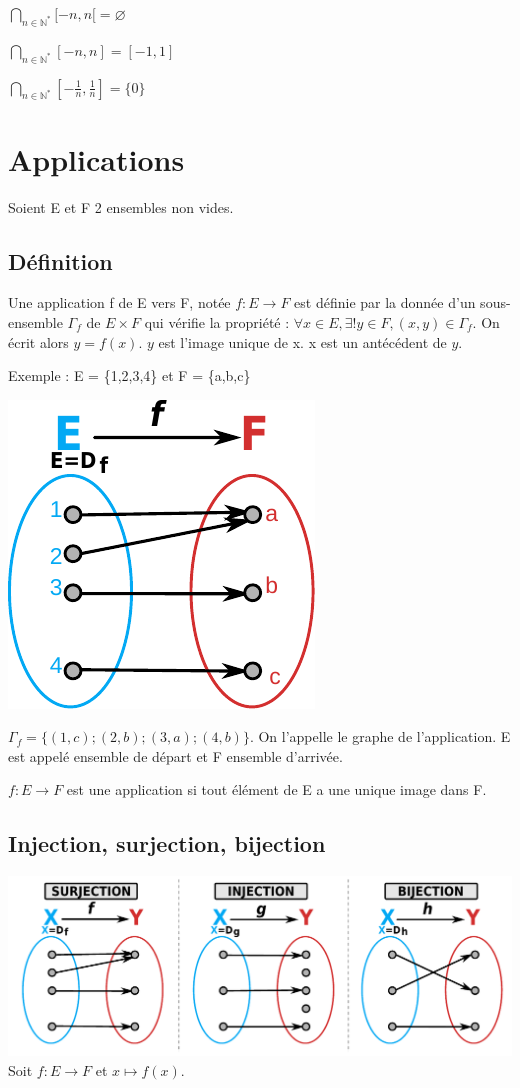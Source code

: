 \documentclass[french]{yLectureNote}
\begin{document}
$\bigcap\limits_{n\in \mathbb{N}^*} [-n, n[ = \varnothing$

$\bigcap\limits_{n\in \mathbb{N}^*} [-n, n] = [-1,1]$

$\bigcap\limits_{n\in \mathbb{N}^*} [-\frac{1}{n}, \frac{1}{n}] = \{0\}$

\section{Applications}
Soient E et F 2 ensembles non vides.
\subsection{Définition}
\begin{theorem}[Definition]
Une application f de E vers F, notée $f:E \rightarrow F$ est définie par la donnée d'un sous-ensemble $\Gamma_f$ de $E \times F$ qui vérifie la propriété : $\forall x \in E, \exists!y\in F, (x,y)\in \Gamma_f$. On écrit alors $y = f(x)$. $y$ est l'image unique de x. x est un antécédent de $y$.
\end{theorem}

Exemple : E = \{1,2,3,4\} et F = \{a,b,c\}

\includegraphics[scale=0.8]{app-def}

$\Gamma_f = \{(1,c);(2,b);(3,a);(4,b)\}$. On l'appelle le graphe de l'application. E est appelé ensemble de départ et F ensemble d'arrivée.

$f:E \rightarrow F$ est une application si tout élément de E a une unique image dans F.
\subsection{Injection, surjection, bijection}
\includegraphics[scale=0.6]{application}
Soit $f:E\rightarrow F$ et $x\longmapsto f(x)$.
\end{document}
